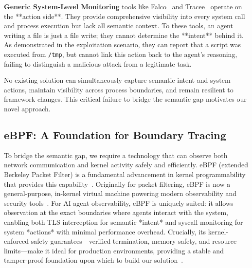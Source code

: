 \textbf{Generic System-Level Monitoring} tools like Falco~\cite{falco} and Tracee~\cite{tracee} operate on the **action side**. They provide comprehensive visibility into every system call and process execution but lack all semantic context. To these tools, an agent writing a file is just a file write; they cannot determine the **intent** behind it. As demonstrated in the exploitation scenario, they can report that a script was executed from \texttt{/tmp}, but cannot link this action back to the agent's reasoning, failing to distinguish a malicious attack from a legitimate task.

No existing solution can simultaneously capture semantic intent and system actions, maintain visibility across process boundaries, and remain resilient to framework changes. This critical failure to bridge the semantic gap motivates our novel approach.

\subsection{eBPF: A Foundation for Boundary Tracing}
To bridge the semantic gap, we require a technology that can observe both network communication and kernel activity safely and efficiently. eBPF (extended Berkeley Packet Filter) is a fundamental advancement in kernel programmability that provides this capability~\cite{brendangregg}. Originally for packet filtering, eBPF is now a general-purpose, in-kernel virtual machine powering modern observability and security tools~\cite{ebpfio,cilium}. For AI agent observability, eBPF is uniquely suited: it allows observation at the exact boundaries where agents interact with the system, enabling both TLS interception for semantic *intent* and syscall monitoring for system *actions* with minimal performance overhead. Crucially, its kernel-enforced safety guarantees—verified termination, memory safety, and resource limits—make it ideal for production environments, providing a stable and tamper-proof foundation upon which to build our solution~\cite{kerneldoc}.